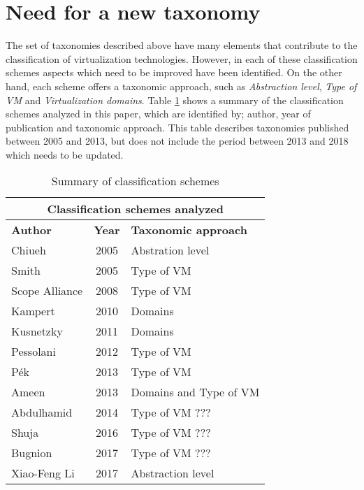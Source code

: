 	\section {Need for a new taxonomy}\label{sec:necesidadDeUnaTaxonomia}
	
	The set of taxonomies described above have many elements that contribute to the classification of virtualization technologies. However, in each of these classification schemes aspects which need to be improved have been identified. On the other hand, each scheme offers a taxonomic approach, such as \textit{Abstraction level}, \textit{Type of VM} and \textit{Virtualization domains}. Table \ref{cuadro:resumenTrabajos} shows a summary of the classification schemes analyzed in this paper, which are identified by; author, year of publication and taxonomic approach. This table describes taxonomies published between 2005 and 2013, but does not include the period between 2013 and 2018 which needs to be updated.
	
	
	\begin{table}[H]
		\centering
		\begin{tabular}{|l|c|l|}
			\hline
			\multicolumn{3}{|c|}{\textbf{Classification schemes analyzed}}\\
			\hline
			\textbf{Author} & \textbf{Year} & \textbf{Taxonomic approach} \\ 
			\hline
			Chiueh          & 2005          & Abstration level\\ 
			\hline
			Smith           & 2005          & Type of VM\\ 
			\hline
			Scope Alliance  & 2008          & Type of VM\\ 
			\hline
			Kampert         & 2010          & Domains\\ 
			\hline
			Kusnetzky       & 2011          & Domains\\ 
			\hline
			Pessolani       & 2012          & Type of VM\\ 
			\hline
			P{\'e}k         & 2013          & Type of VM\\ 
			\hline
			Ameen           & 2013          & Domains and Type of VM\\ 
			\hline
			Abdulhamid      & 2014          & Type of VM ???\\ 
			\hline
			Shuja           & 2016          & Type of VM ???\\ 
			\hline
			Bugnion         & 2017          & Type of VM ???\\ 
			\hline
			Xiao-Feng Li    & 2017          & Abstraction level\\ 
			\hline
		\end{tabular}
		\caption{Summary of classification schemes}
		\label{cuadro:resumenTrabajos}
		
	\end{table}

